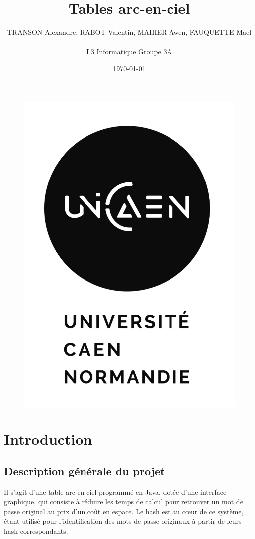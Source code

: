 \documentclass[a4paper,12pt]{article}
\title{\textbf{Tables arc-en-ciel}}
\author{TRANSON Alexandre, RABOT Valentin, MAHIER Awen, FAUQUETTE Mael \\ \\ L3 Informatique Groupe 3A}
\date{\today}
\begin{document}
\maketitle
\begin{figure}[h]
\centering
\includegraphics[scale=1]{img/LogoUniCaen.png}
\end{figure}

\newpage
\tableofcontents
\newpage

\section{Introduction}
\subsection{Description générale du projet}
Il s'agit d'une table arc-en-ciel programmé en Java, dotée d'une interface graphique, qui consiste à réduire les temps de calcul pour retrouver un mot de passe original au prix d'un coût en espace. Le hash est au cœur de ce système, étant utilisé pour l'identification des mots de passe originaux à partir de leurs hash correspondants.
\end{document}
